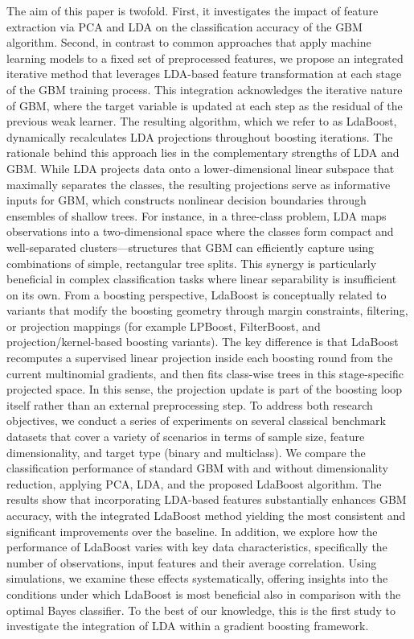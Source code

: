 \documentclass[11pt,a4paper]{article}
\begin{document}
The aim of this paper is twofold. First, it investigates the impact of feature extraction via PCA and LDA on the classification accuracy of the GBM algorithm. Second, in contrast to common approaches that apply machine learning models to a fixed set of preprocessed features, we propose an integrated iterative method that leverages LDA-based feature transformation at each stage of the GBM training process. This integration acknowledges the iterative nature of GBM, where the target variable is updated at each step as the residual of the previous weak learner. The resulting algorithm, which we refer to as LdaBoost, dynamically recalculates LDA projections throughout boosting iterations.
The rationale behind this approach lies in the complementary strengths of LDA and GBM. While LDA projects data onto a lower-dimensional linear subspace that maximally separates the classes, the resulting projections serve as informative inputs for GBM, which constructs nonlinear decision boundaries through ensembles of shallow trees. For instance, in a three-class problem, LDA maps observations into a two-dimensional space where the classes form compact and well-separated clusters---structures that GBM can efficiently capture using combinations of simple, rectangular tree splits. This synergy is particularly beneficial in complex classification tasks where linear separability is insufficient on its own.
From a boosting perspective, LdaBoost is conceptually related to variants that modify the boosting geometry through margin constraints, filtering, or projection mappings (for example LPBoost, FilterBoost, and projection/kernel-based boosting variants). The key difference is that LdaBoost recomputes a supervised linear projection inside each boosting round from the current multinomial gradients, and then fits class-wise trees in this stage-specific projected space. In this sense, the projection update is part of the boosting loop itself rather than an external preprocessing step.
To address both research objectives, we conduct a series of experiments on several classical benchmark datasets that cover a variety of scenarios in terms of sample size, feature dimensionality, and target type (binary and multiclass). We compare the classification performance of standard GBM with and without dimensionality reduction, applying PCA, LDA, and the proposed LdaBoost algorithm. The results show that incorporating LDA-based features substantially enhances GBM accuracy, with the integrated LdaBoost method yielding the most consistent and significant improvements over the baseline.
In addition, we explore how the performance of LdaBoost varies with key data characteristics, specifically the number of observations, input features and their average correlation. Using simulations, we examine these effects systematically, offering insights into the conditions under which LdaBoost is most beneficial also in comparison with the optimal Bayes classifier. To the best of our knowledge, this is the first study to investigate the integration of LDA within a gradient boosting framework.
\end{document}
